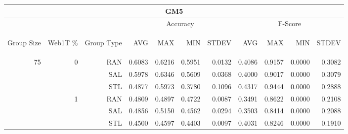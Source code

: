 \begin{center}
\begin{table}[htbp]
\begin{tabular}{ | r | r | r | r | r | r | r | r | r | r | r |}
\hline
\multicolumn{11}{|c|}{GM5}\\
\hline
 & & & \multicolumn{4}{|c|}{Accuracy} & \multicolumn{4}{|c|}{F-Score}\\ \cline{4-11}
\begin{sideways}Group Size\end{sideways} & \begin{sideways}Web1T \%\end{sideways} & \begin{sideways}Group Type\end{sideways} & \begin{sideways}AVG\end{sideways} & \begin{sideways}MAX\end{sideways} & \begin{sideways}MIN\end{sideways} & \begin{sideways}STDEV\end{sideways} & \begin{sideways}AVG\end{sideways} & \begin{sideways}MAX\end{sideways} & \begin{sideways}MIN\end{sideways} & \begin{sideways}STDEV\end{sideways}\\
\hline
\multirow{18}{*}{75}
 & \multirow{3}{*}{0} & RAN & 0.6083 & 0.6216 & 0.5951 & 0.0132 & 0.4086 & 0.9157 & 0.0000 & 0.3082\\ \cline{3-11}
 &   & SAL & 0.5978 & 0.6346 & 0.5609 & 0.0368 & 0.4000 & 0.9017 & 0.0000 & 0.3079\\ \cline{3-11}
 &   & STL & 0.4877 & 0.5973 & 0.3780 & 0.1096 & 0.4317 & 0.9444 & 0.0000 & 0.2888\\ \cline{2-11}
 & \multirow{3}{*}{1} & RAN & 0.4809 & 0.4897 & 0.4722 & 0.0087 & 0.3491 & 0.8622 & 0.0000 & 0.2108\\ \cline{3-11}
 &   & SAL & 0.4856 & 0.5150 & 0.4562 & 0.0294 & 0.3503 & 0.8414 & 0.0000 & 0.2088\\ \cline{3-11}
 &   & STL & 0.4500 & 0.4597 & 0.4403 & 0.0097 & 0.4031 & 0.8246 & 0.0000 & 0.1910\\ \cline{2-11}

\end{tabular}
\end{table}
\end{center}
